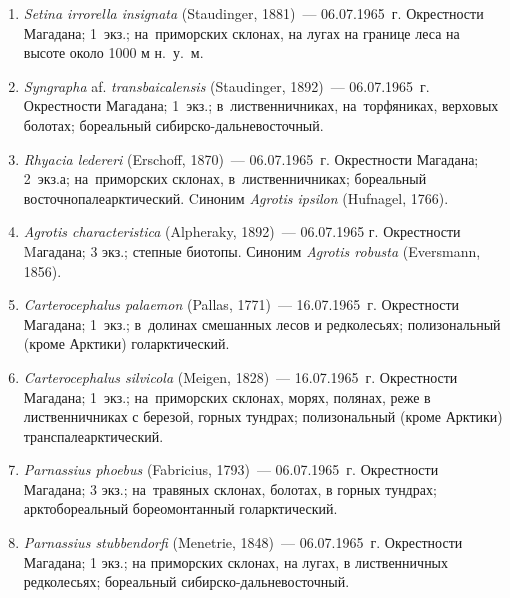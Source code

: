 \begin{enumerate}[noitemsep, leftmargin=0cm]

      \item \textit{Setina irrorella insignata} (Staudinger, 1881)~--- 06.07.1965~г. Окрестности Магадана; 1~экз.; на~приморских склонах, на лугах на границе леса на высоте около 1000 м н.~у.~м.


      \item \textit{Syngrapha} af. \textit{transbaicalensis} (Staudinger, 1892)~--- 06.07.1965~г. Окрестности Магадана; 1~экз.; в~лиственничниках, на~торфяниках, верховых болотах; бореальный сибирско-дальневосточный.

      \item \textit{Rhyacia ledereri} (Erschoff, 1870)~--- 06.07.1965~г. Окрестности Магадана; 2~экз.а; на~приморских склонах, в~лиственничниках; бореальный восточнопалеарктический. Cиноним \textit{Agrotis ipsilon} (Hufnagel, 1766).

      \item \textit{Agrotis characteristica} (Alpheraky, 1892)~--- 06.07.1965 г. Окрестности Mагадана; 3 экз.; степные биотопы. Синоним \textit{Agrotis robusta} (Eversmann, 1856).


      \item \textit{Carterocephalus palaemon} (Pallas, 1771)~--- 16.07.1965~г. Окрестности Магадана; 1~экз.; в~долинах смешанных лесов и редколесьях; полизональный (кроме Арктики) голарктический.

      \item \textit{Carterocephalus silvicola} (Meigen, 1828)~--- 16.07.1965~г. Окрестности Магадана; 1~экз.; на~приморских склонах, морях, полянах, реже в лиственничниках с березой, горных тундрах; полизональный (кроме Арктики) транспалеарктический.


      \item \textit{Parnassius phoebus} (Fabricius, 1793)~--- 06.07.1965~г. Окрестности Магадана; 3 экз.; на~травяных склонах, болотах, в горных тундрах; арктобореальный бореомонтанный голарктический.

    \item \textit{Parnassius stubbendorfi} (Menetrie, 1848)~--- 06.07.1965~г. Окрестности Магадана; 1 экз.; на приморских склонах, на лугах, в лиственничных редколесьях; бореальный сибирско-дальневосточный.


\end{enumerate}
